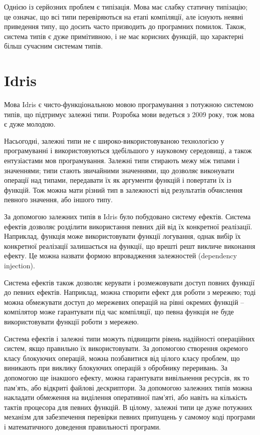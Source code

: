 \documentclass[oneside,14pt,a4paper,final]{myextreport}
\begin{document}
Однією із серйозних проблем \LangC{} є типізація. Мова \LangC{} має слабку статичну типізацію; це означає, що всі типи перевіряються на етапі компіляції, але існують неявні приведення типу, що досить часто призводить до програмних помилок. Також, система типів є дуже примітивною, і не має корисних функцій, що характерні більш сучасним системам типів.

\section{Idris}

Мова Idris\cite{idris} є чисто-функціональною мовою програмування з потужною системою типів, що підтримує залежні типи. Розробка мови ведеться з 2009 року\cite{idris:first-release}, тож мова є дуже молодою.

Насьогодні, залежні типи не є широко-використовуваною технологією у програмуванні і використовуються здебільшого у науковому середовищі, а також ентузіастами мов програмування. Залежні типи стирають межу між типами і значеннями; типи стають звичайними значеннями, що дозволяє виконувати операції над типами, передавати їх як аргументи функцій і повертати їх із функцій. Тож можна мати різний тип в залежності від результатів обчислення певного значення, або іншого типу.

За допомогою залежних типів в Idris було побудовано систему ефектів. Система ефектів дозволяє розділити використання певних дій від їх конкретної реалізації. Наприклад, функція може використовувати функції логування, однак вибір їх конкретної реалізації залишається на функції, що врешті решт викличе виконання ефекту. Це можна назвати формою впровадження залежностей (dependency injection). 


Система ефектів також дозволяє керувати і розмежовувати доступ повних функції до певних ефектів. Наприклад, можна створити ефект для роботи з мережею; тоді можна обмежувати доступ до мережевих операцій на рівні окремих функцій -- компілятор може гарантувати під час компіляції, що певна функція не буде використовувати функції роботи з мережею.

Система ефектів і залежні типи можуть підвищити рівень надійності операційних систем, якщо правильно їх використовувати. За допомогою створення окремого класу блокуючих операцій, можна позбавитися від цілого класу проблем, що виникають при виклику блокуючих операцій з обробнику переривань. За допомогою ще інакшого ефекту, можна гарантувати вивільнення ресурсів, як то пам'ять, або відкриті файлові дескриптори. За допомогою залежних типів можна накладати обмеження на виділення оперативної пам'яті, або навіть на кількість тактів процесора для певних функцій. В цілому, залежні типи це дуже потужних механізм для забезпечення перевірки певних припущень у самомоу коді програми і математичного доведення правильності програми.
\end{document}
